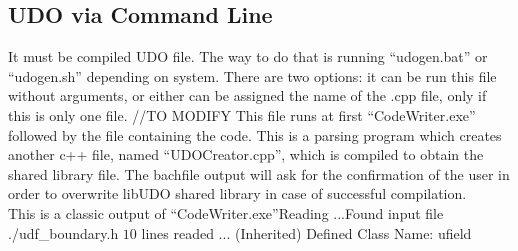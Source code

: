 \documentclass{article}     %
\begin{document}
\subsection{UDO via Command Line}

It must be compiled UDO file. The way to do that is running “udogen.bat” or “udogen.sh” depending on system. There are two options: it can be run this file without arguments, or either can be assigned the name of the .cpp file, only if this is only one file. //TO MODIFY
This file runs at first “CodeWriter.exe” followed by the file containing the code. This is a parsing program which creates another c++ file, named “UDOCreator.cpp”, which is compiled to obtain the shared library file. The bachfile output will ask for the confirmation of the user in order to overwrite libUDO shared library in case of successful compilation.
\\
This is a classic output of “CodeWriter.exe”\newline
[I] Reading ...\newline
[I] Found input file ./udf\_boundary.h \newline
[I] $10$ lines readed ...\newline
(Inherited) Defined Class Name: ufield\newline
\end{document}
